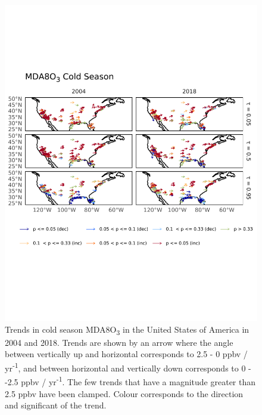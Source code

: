 \documentclass{article}
\begin{document}
\begin{figure}[p]
\centering
\includegraphics[height=0.9\textheight]{figures/si_figures/fS08_o3_map_mda8_cold_us_o3.pdf}
\caption{Trends in cold season MDA8O\textsubscript{3} in the United States of America in 2004 and 2018. Trends are shown by an arrow where the angle between vertically up and horizontal corresponds to 2.5 - 0 ppbv / yr\textsuperscript{-1}, and between horizontal and vertically down corresponds to 0 - -2.5 ppbv / yr\textsuperscript{-1}. The few trends that have a magnitude greater than 2.5 ppbv have been clamped. Colour corresponds to the direction and significant of the trend.}
\label{si_fig:o3_map_us_mda8_cold}
\end{figure}
\clearpage
\end{document}
